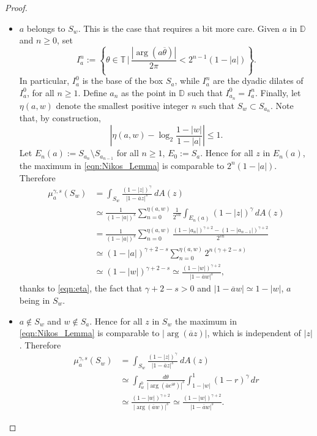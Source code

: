 \documentclass[12pt]{amsart}
\theoremstyle{definition}
\newcommand{\T}{\mathbb{{T}}}
\newcommand{\D}{\mathbb{{D}}}
\numberwithin{equation}{section}
\begin{document}
\begin{proof}
\begin{itemize}
                \item $a$ belongs to $S_w$. This is the case that requires a bit more care. Given $a$ in $\D$ and $n\ge0$, set 
                    \[
                        I^n_a:=\left\{\theta\in\T\,\bigg|\, \frac{|\arg(a\overline{\theta})|}{2\pi}<2^{n-1}(1-|a|)\right\}.
                    \]
                    In particular, $I^0_a$ is the base of the box $S_a$, while $I^n_a$ are the dyadic dilates of $I^0_a$, for all $n\ge1$. Define $a_n$ as the point in $\D$ such that $I^0_{a_n}=I_a^n$.  Finally, let $\eta(a, w)$ denote the smallest positive integer $n$ such that $S_w\subset S_{a_n}$. Note that, by construction, 
                    \begin{equation}
                    \label{eqn:eta}
                        \left|\eta(a, w)-\log_2\frac{1-|w|}{1-|a|}\right|\le 1. 
                    \end{equation}
                    Let $E_n(a):=S_{a_n}\setminus S_{a_{n-1}}$ for all $n\ge1$, $E_0:=S_a$. Hence for all $z$ in $E_n(a)$, the maximum in \eqref{eqn:Nikos_Lemma} is comparable to $2^n(1-|a|)$. Therefore 
                    \[
                        \begin{split}
                            \mu^{\gamma, s}_a(S_w)&=\int_{S_w}\frac{(1-|z|)^\gamma}{|1-\overline az|^s}~dA(z)\\
                            &\simeq\frac{1}{(1-|a|)^s}\sum_{n=0}^{\eta(a, w)}\frac{1}{2^{sn}}\int_{E_n(a)}(1-|z|)^\gamma\,dA(z)\\
                            &=\frac{1}{(1-|a|)^s}\sum_{n=0}^{\eta(a, w)}\frac{(1-|a_n|)^{\gamma+2}-(1-|a_{n-1}|)^{\gamma+2}}{2^{sn}}\\
                            &\simeq(1-|a|)^{\gamma+2-s}\sum_{n=0}^{\eta(a, w)}2^{n(\gamma+2-s)}\\
                            &\simeq(1-|w|)^{\gamma+2-s}\simeq\frac{(1-|w|)^{\gamma+2}}{|1-\overline aw|^s}, 
                        \end{split}
                    \]
                    thanks to \eqref{eqn:eta}, the fact that $\gamma+2-s>0$ and $|1-\overline aw|\simeq 1-|w|$, $a$ being in $S_w$.
            
                \item $a\notin S_w$ and $w\notin S_a$. Hence for all $z$ in $S_w$ the maximum in \eqref{eqn:Nikos_Lemma} is comparable to $|\arg(\overline az)|$, which is independent of $|z|$. Therefore
                \[
                    \begin{split}
                        \mu_a^{\gamma, s}(S_w)&=\int_{S_w}\frac{(1-|z|)^\gamma}{|1-\overline az|^s}~dA(z)\\
                        &\simeq\int_{I^0_{w}}\frac{d\theta}{|\arg(\overline ae^{i\theta})|^s}\int_{1-|w|}^1(1-r)^\gamma\,dr\\
                        &\simeq\frac{(1-|w|)^{\gamma+2}}{|\arg(\overline aw)|^s}\simeq\frac{(1-|w|)^{\gamma+2}}{|1-\overline aw|^s}.
                    \end{split}
                \]
            \end{itemize}
        \end{proof}
        
\end{document}
